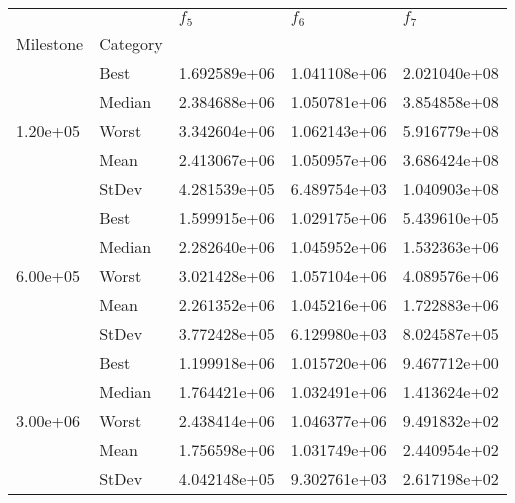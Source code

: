 \begin{tabular}{lllll}
\toprule
         &      &      $f_{5}$ &      $f_{6}$ &      $f_{7}$ \\
Milestone & Category &              &              &              \\
\midrule
\multirow{5}{*}{1.20e+05} & Best & 1.692589e+06 & 1.041108e+06 & 2.021040e+08 \\
         & Median & 2.384688e+06 & 1.050781e+06 & 3.854858e+08 \\
         & Worst & 3.342604e+06 & 1.062143e+06 & 5.916779e+08 \\
         & Mean & 2.413067e+06 & 1.050957e+06 & 3.686424e+08 \\
         & StDev & 4.281539e+05 & 6.489754e+03 & 1.040903e+08 \\
\cline{1-5}
\multirow{5}{*}{6.00e+05} & Best & 1.599915e+06 & 1.029175e+06 & 5.439610e+05 \\
         & Median & 2.282640e+06 & 1.045952e+06 & 1.532363e+06 \\
         & Worst & 3.021428e+06 & 1.057104e+06 & 4.089576e+06 \\
         & Mean & 2.261352e+06 & 1.045216e+06 & 1.722883e+06 \\
         & StDev & 3.772428e+05 & 6.129980e+03 & 8.024587e+05 \\
\cline{1-5}
\multirow{5}{*}{3.00e+06} & Best & 1.199918e+06 & 1.015720e+06 & 9.467712e+00 \\
         & Median & 1.764421e+06 & 1.032491e+06 & 1.413624e+02 \\
         & Worst & 2.438414e+06 & 1.046377e+06 & 9.491832e+02 \\
         & Mean & 1.756598e+06 & 1.031749e+06 & 2.440954e+02 \\
         & StDev & 4.042148e+05 & 9.302761e+03 & 2.617198e+02 \\
\bottomrule
\end{tabular}

